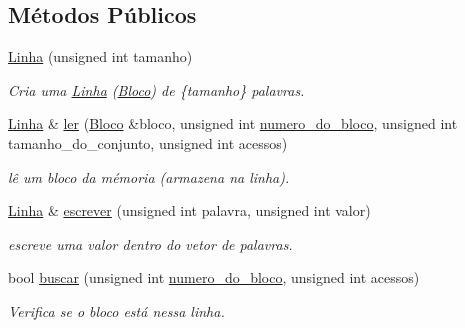 \subsection*{Métodos Públicos}
\begin{DoxyCompactItemize}
\item 
\hyperlink{structLinha_a4482bff9f7dc3c59b801b88c9b524f70}{Linha} (unsigned int tamanho)
\begin{DoxyCompactList}\small\item\em Cria uma \hyperlink{structLinha}{Linha} (\hyperlink{structBloco}{Bloco}) de \{tamanho\} palavras. \end{DoxyCompactList}\item 
\hyperlink{structLinha}{Linha} \& \hyperlink{structLinha_a93ee2fba6780638546c4bbf78445e8bc}{ler} (\hyperlink{structBloco}{Bloco} \&bloco, unsigned int \hyperlink{structLinha_ab9ce9d1248c2abd2211539f09d8c6e0a}{numero\+\_\+do\+\_\+bloco}, unsigned int tamanho\+\_\+do\+\_\+conjunto, unsigned int acessos)
\begin{DoxyCompactList}\small\item\em lê um bloco da mémoria (armazena na linha). \end{DoxyCompactList}\item 
\hyperlink{structLinha}{Linha} \& \hyperlink{structLinha_aa7aa98581c6cd16951abb275fe78727d}{escrever} (unsigned int palavra, unsigned int valor)
\begin{DoxyCompactList}\small\item\em escreve uma valor dentro do vetor de palavras. \end{DoxyCompactList}\item 
bool \hyperlink{structLinha_a7c1d9293e17a1919e53dc35df4c2e5c3}{buscar} (unsigned int \hyperlink{structLinha_ab9ce9d1248c2abd2211539f09d8c6e0a}{numero\+\_\+do\+\_\+bloco}, unsigned int acessos)
\begin{DoxyCompactList}\small\item\em Verifica se o bloco está nessa linha. \end{DoxyCompactList}\end{DoxyCompactItemize}
